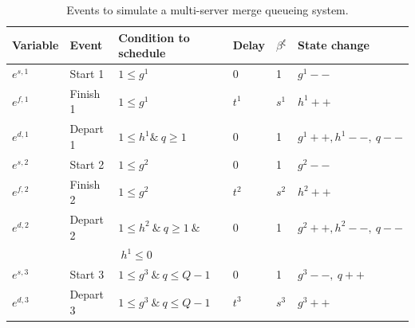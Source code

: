 \documentclass[]{interact}
\theoremstyle{plain}%
\theoremstyle{definition}
\theoremstyle{remark}
\begin{document}
\begin{table}[h]
	\begin{tabular}{|llllll|}\hline
		Variable&Event & Condition to schedule & Delay&$\beta^{\xi}$& State change\\\hline
		$e^{s,1}$&Start 1 	& $1\le g^1$ & $0$&1& $g^1--$ \\\hline
		$e^{f,1}$&Finish 1 & $1\le g^1$ 	& $t^1$ &$s^1$& $h^1++$\\\hline 
		$e^{d,1}$&Depart 1& $1\le h^1 \&\  q\ge 1$&$0$ &1 & $g^1++,h^1--,\ q--$\\\hline
		$e^{s,2}$&Start 2 	& $1\le g^2$ & $0$ &1& $g^2--$ \\	\hline
		$e^{f,2}$&Finish 2 & $1\le g^2$ 	& $t^2$ &$s^2$ & $h^2++$\\\hline
		$e^{d,2}$&Depart 2& $1\le h^2\ \&\ q\ge 1\ \&$&$0$  &1&  $g^2++,h^2--,\ q--$\\
		&&$\ h^1\le 0 $ & &&\\\hline
		$e^{s,3}$& Start 3 & $1\le g^3\ \&\ q\le Q-1$&$0$  &1& $g^3--,\ q++$\\\hline
		$e^{d,3}$& Depart 3 & $1\le g^3\ \&\ q\le Q-1$ & $t^3$  &$s^3$& $g^3++$\\\hline
	\end{tabular}
	\caption{Events to simulate a multi-server merge queueing system.}
	\label{tab:multimerge}
\end{table}

\newpage
\newpage
\end{document}
